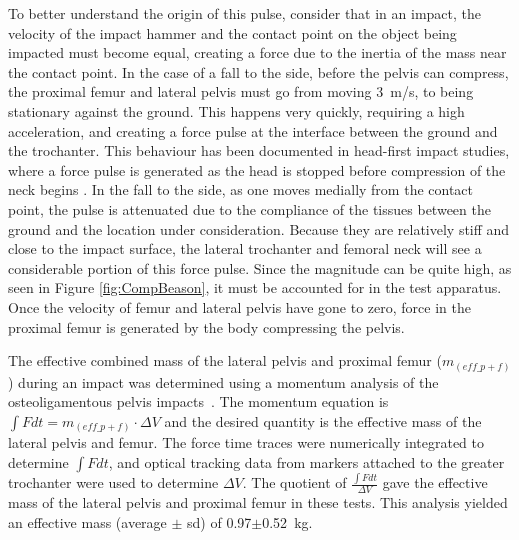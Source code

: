 		To better understand the origin of this pulse, consider that in an impact, the velocity of the impact hammer and the contact point on the object being impacted must become equal, creating a force due to the inertia of the mass near the contact point.
		In the case of a fall to the side, before the pelvis can compress, the proximal femur and lateral pelvis must go from moving 3~\ac{m}/\ac{s}, to being stationary against the ground.
		This happens very quickly, requiring a high acceleration, and creating a force pulse at the interface between the ground and the trochanter.
		This behaviour has been documented in head-first impact studies, where a force pulse is generated as the head is stopped before compression of the neck begins \citep{nightingale_dynamic_1997, saari_cervical_2011}.
		In the fall to the side, as one moves medially from the contact point, the pulse is attenuated due to the compliance of the tissues between the ground and the location under consideration.
		Because they are relatively stiff and close to the impact surface, the lateral trochanter and femoral neck will see a considerable portion of this force pulse.
		Since the magnitude can be quite high, as seen in Figure \ref{fig:CompBeason}, it must be accounted for in the test apparatus.
		Once the velocity of femur and lateral pelvis have gone to zero, force in the proximal femur is generated by the body compressing the pelvis.
		
		The effective combined mass of the lateral pelvis and proximal femur ($m_{(eff\_p+f)}$) during an impact was determined using a momentum analysis of the osteoligamentous pelvis impacts~\citep{beason_bone_2003}.
		The momentum equation is $\int Fdt = m_{(eff\_p+f)}\cdot \varDelta V$ and the desired quantity is the effective mass of the lateral pelvis and femur.
		The force time traces were numerically integrated to determine $\int Fdt$, and optical tracking data from markers attached to the greater trochanter were used to determine $\varDelta V$.
		The quotient of $ \frac{\int Fdt}{\Delta V} $ gave the effective mass of the lateral pelvis and proximal femur in these tests.
		This analysis yielded an effective mass (average $\pm$ \ac{sd}) of 0.97$\pm$0.52~\ac{kg}.
		
